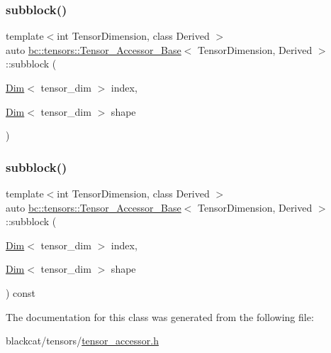 \mbox{\label{classbc_1_1tensors_1_1Tensor__Accessor__Base_af991c2757db619e67d6291a8cf46f79f}} 
\subsubsection{\texorpdfstring{subblock()}{subblock()}\hspace{0.1cm}{\footnotesize\ttfamily [1/2]}}
{\footnotesize\ttfamily template$<$int Tensor\+Dimension, class Derived $>$ \\
auto \hyperlink{classbc_1_1tensors_1_1Tensor__Accessor__Base}{bc\+::tensors\+::\+Tensor\+\_\+\+Accessor\+\_\+\+Base}$<$ Tensor\+Dimension, Derived $>$\+::subblock (\begin{DoxyParamCaption}\item[{\hyperlink{structbc_1_1Dim}{Dim}$<$ tensor\+\_\+dim $>$}]{index,  }\item[{\hyperlink{structbc_1_1Dim}{Dim}$<$ tensor\+\_\+dim $>$}]{shape }\end{DoxyParamCaption})\hspace{0.3cm}{\ttfamily [inline]}}

\mbox{\label{classbc_1_1tensors_1_1Tensor__Accessor__Base_ab3e8e0661cfbfbb982c871f8cc814dfb}} 
\subsubsection{\texorpdfstring{subblock()}{subblock()}\hspace{0.1cm}{\footnotesize\ttfamily [2/2]}}
{\footnotesize\ttfamily template$<$int Tensor\+Dimension, class Derived $>$ \\
auto \hyperlink{classbc_1_1tensors_1_1Tensor__Accessor__Base}{bc\+::tensors\+::\+Tensor\+\_\+\+Accessor\+\_\+\+Base}$<$ Tensor\+Dimension, Derived $>$\+::subblock (\begin{DoxyParamCaption}\item[{\hyperlink{structbc_1_1Dim}{Dim}$<$ tensor\+\_\+dim $>$}]{index,  }\item[{\hyperlink{structbc_1_1Dim}{Dim}$<$ tensor\+\_\+dim $>$}]{shape }\end{DoxyParamCaption}) const\hspace{0.3cm}{\ttfamily [inline]}}



The documentation for this class was generated from the following file\+:\begin{DoxyCompactItemize}
\item 
blackcat/tensors/\hyperlink{tensor__accessor_8h}{tensor\+\_\+accessor.\+h}\end{DoxyCompactItemize}
